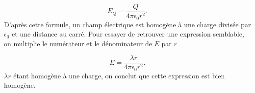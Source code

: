 \documentclass[12pt]{book}
\begin{document}
\begin{equation*}
	E_Q = \dfrac{Q}{4 \pi \epsilon_0 r^2}.
\end{equation*}
D'après cette formule, un champ électrique est homogène à une charge divisée 
par $\epsilon_0$ et une distance au carré. Pour essayer de retrouver une expression
semblable, on multiplie le numérateur et le dénominateur de $E$ par $r$

\begin{equation*}
	E = \dfrac{\lambda r}{4 \pi \epsilon_0 r^2}.
\end{equation*}
$\lambda r$ étant homogène à une charge, on conclut que cette expression est 
bien homogène.
\end{document}
